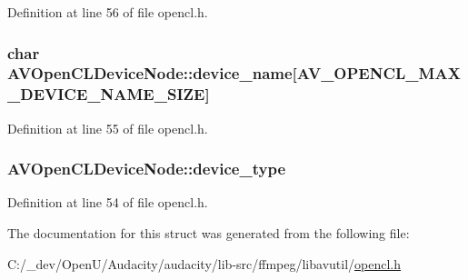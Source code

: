 Definition at line 56 of file opencl.\+h.

\subsubsection[{\texorpdfstring{device\+\_\+name}{device_name}}]{\setlength{\rightskip}{0pt plus 5cm}char A\+V\+Open\+C\+L\+Device\+Node\+::device\+\_\+name\mbox{[}{\bf A\+V\+\_\+\+O\+P\+E\+N\+C\+L\+\_\+\+M\+A\+X\+\_\+\+D\+E\+V\+I\+C\+E\+\_\+\+N\+A\+M\+E\+\_\+\+S\+I\+ZE}\mbox{]}}\hypertarget{struct_a_v_open_c_l_device_node_ac8b30e51e84b36c28af5a538619062cb}{}\label{struct_a_v_open_c_l_device_node_ac8b30e51e84b36c28af5a538619062cb}


Definition at line 55 of file opencl.\+h.

\subsubsection[{\texorpdfstring{device\+\_\+type}{device_type}}]{ A\+V\+Open\+C\+L\+Device\+Node\+::device\+\_\+type}\hypertarget{struct_a_v_open_c_l_device_node_aa92cf6d76c74ab01103c6a0ce00f43ae}{}\label{struct_a_v_open_c_l_device_node_aa92cf6d76c74ab01103c6a0ce00f43ae}


Definition at line 54 of file opencl.\+h.



The documentation for this struct was generated from the following file\+:\begin{DoxyCompactItemize}
\item 
C\+:/\+\_\+dev/\+Open\+U/\+Audacity/audacity/lib-\/src/ffmpeg/libavutil/\hyperlink{opencl_8h}{opencl.\+h}\end{DoxyCompactItemize}
